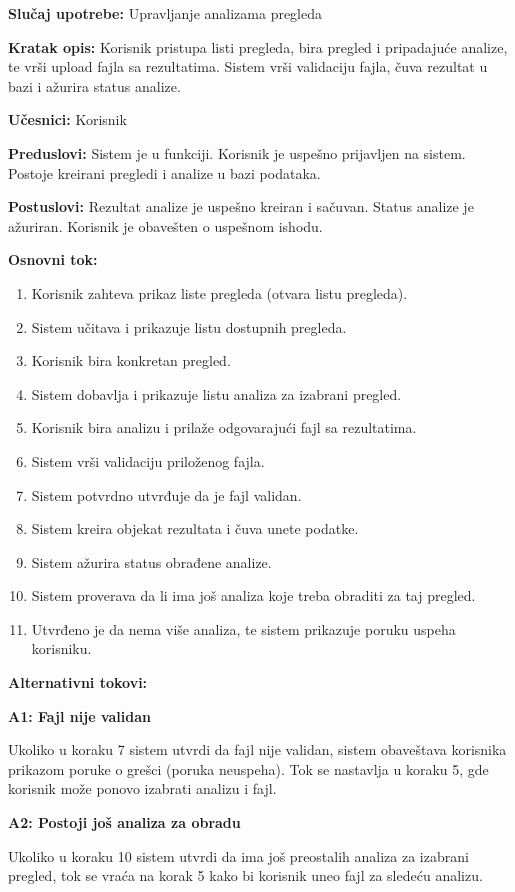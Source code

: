 \documentclass[11pt]{article}
\begin{document}
\textbf{Slučaj upotrebe:} Upravljanje analizama pregleda

\textbf{Kratak opis:} Korisnik pristupa listi pregleda, bira pregled i pripadajuće analize, te vrši upload fajla sa rezultatima. Sistem vrši validaciju fajla, čuva rezultat u bazi i ažurira status analize.

\textbf{Učesnici:} Korisnik

\textbf{Preduslovi:} Sistem je u funkciji. Korisnik je uspešno prijavljen na sistem. Postoje kreirani pregledi i analize u bazi podataka.

\textbf{Postuslovi:} Rezultat analize je uspešno kreiran i sačuvan. Status analize je ažuriran. Korisnik je obavešten o uspešnom ishodu.

\textbf{Osnovni tok:}
\begin{enumerate}
    \item Korisnik zahteva prikaz liste pregleda (otvara listu pregleda).
    \item Sistem učitava i prikazuje listu dostupnih pregleda.
    \item Korisnik bira konkretan pregled.
    \item Sistem dobavlja i prikazuje listu analiza za izabrani pregled.
    \item Korisnik bira analizu i prilaže odgovarajući fajl sa rezultatima.
    \item Sistem vrši validaciju priloženog fajla.
    \item Sistem potvrdno utvrđuje da je fajl validan.
    \item Sistem kreira objekat rezultata i čuva unete podatke.
    \item Sistem ažurira status obrađene analize.
    \item Sistem proverava da li ima još analiza koje treba obraditi za taj pregled.
    \item Utvrđeno je da nema više analiza, te sistem prikazuje poruku uspeha korisniku.
\end{enumerate}

\textbf{Alternativni tokovi:}

\textbf{A1: Fajl nije validan}

Ukoliko u koraku 7 sistem utvrdi da fajl nije validan, sistem obaveštava korisnika prikazom poruke o grešci (poruka neuspeha). Tok se nastavlja u koraku 5, gde korisnik može ponovo izabrati analizu i fajl.

\textbf{A2: Postoji još analiza za obradu}

Ukoliko u koraku 10 sistem utvrdi da ima još preostalih analiza za izabrani pregled, tok se vraća na korak 5 kako bi korisnik uneo fajl za sledeću analizu.
\end{document}
